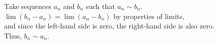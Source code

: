 \documentclass[preview]{standalone}
\begin{document}
\begin{center}
Take sequences $a_n$ and $b_n$ such that $a_n \sim b_n$.\\$\lim (b_n - a_n) = \lim (a_n - b_n)$ by properties of limits,\\and since the left-hand side is zero, the right-hand side is also zero.\\Thus, $b_n \sim a_n$.
\end{center}
\end{document}
